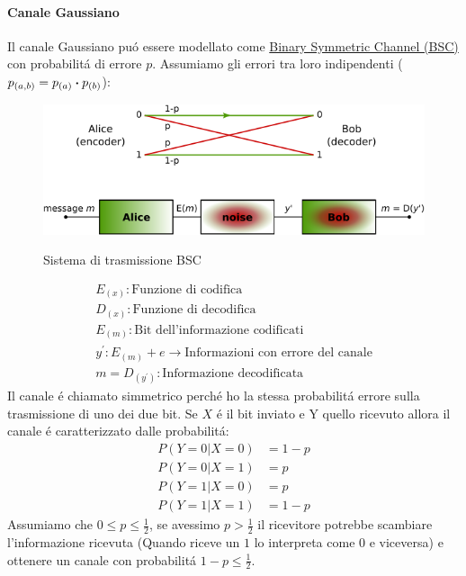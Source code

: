         \paragraph{Canale Gaussiano}
            Il canale Gaussiano puó essere modellato come \href{https://en.wikipedia.org/wiki/Binary_symmetric_channel}{Binary Symmetric Channel (BSC)} con probabilitá di errore $p$. 
            Assumiamo gli errori tra loro indipendenti ($p_{(a,b)} = p_{(a)}\dotproduct p_{(b)}$):
        \begin{figure}[H]
            \centering
            \includegraphics[width = 12cm]{media/600px-Binary_symmetric_channel_(en).svg.png}
            \label{BSC system}
            \caption{Sistema di trasmissione BSC}
        \end{figure}
        \begin{gather}
            E_{(x)}: \text{Funzione di codifica} \nonumber \\
            D_{(x)}: \text{Funzione di decodifica} \nonumber \\
            E_{(m)}: \text{Bit dell'informazione codificati} \nonumber \\
            y^\prime: E_{(m)}+ e \rightarrow \text{Informazioni con errore del canale} \nonumber \\
            m = D_{(y^\prime)}: \text{Informazione decodificata} \nonumber 
        \end{gather}
        Il canale é chiamato simmetrico perché ho la stessa probabilitá errore sulla trasmissione di uno dei due bit.
        Se $X$ é il bit inviato e Y quello ricevuto allora il canale é caratterizzato dalle probabilitá:
        \begin{align}
            P(Y=0|X=0) &= 1-p\nonumber \\
            P(Y=0|X=1) &= p\nonumber \\
            P(Y=1|X=0) &= p\nonumber \\
            P(Y=1|X=1) &= 1-p\nonumber 
        \end{align} 
        Assumiamo che $0\leq p \leq\frac{1}{2}$, se avessimo $p >\frac{1}{2}$ il ricevitore potrebbe scambiare l'informazione ricevuta
        (Quando riceve un $1$ lo interpreta come $0$ e viceversa) e ottenere un canale con probabilitá $1-p \leq\frac{1}{2}$. 
        
